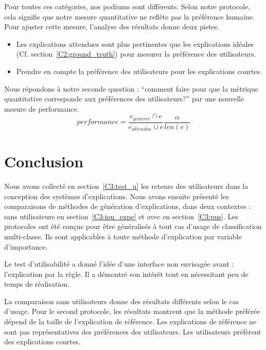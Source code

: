 Pour toutes ces catégories, nos podiums sont différents. Selon notre protocole, cela signifie que notre mesure quantitative ne reflète pas la préférence humaine. Pour ajuster cette mesure, l'analyse des résultats donne deux pistes.
\begin{itemize}
    \item Les explications attendues sont plus pertinentes que les explications idéales (Cf. section~\ref{C2:ground_truth}) pour mesurer la préférence des utilisateurs.
    \item Prendre en compte la préférence des utilisateurs pour les explications courtes.
\end{itemize}
Nous répondons à notre seconde question : ``comment faire pour que la métrique quantitative corresponde aux préférences des utilisateurs?'' par une nouvelle mesure de performance.
\begin{equation}\label{qtm_new}
  performance = \frac{e_{generee} \cap e}{e_{attendue} \cup e} \frac{\alpha}{len(e)}
\end{equation}

\section{Conclusion}

Nous avons collecté en section~\ref{C3:test_u} les retours des utilisateurs dans la conception des systèmes d'explications. Nous avons ensuite présenté les comparaisons de méthodes de génération d'explications, dans deux contextes : sans utilisateurs en section~\ref{C3:iou_expe} et avec en section~\ref{C3:pus}. Les protocoles ont été conçus pour être généralisés à tout cas d'usage de classification multi-classe. Ils sont applicables à toute méthode d'explication par variable d'importance.

Le test d'utilisabilité a donné l'idée d'une interface non envisagée avant : l'explication par la règle. Il a démontré son intérêt tout en nécessitant peu de temps de réalisation.

La comparaison sans utilisateurs donne des résultats différents selon le cas d'usage.
Pour le second protocole, les résultats montrent que la méthode préférée dépend de la taille de l'explication de référence. Les explications de référence ne sont pas représentatives des préférences des utilisateurs. Les utilisateurs préfèrent des explications courtes.

